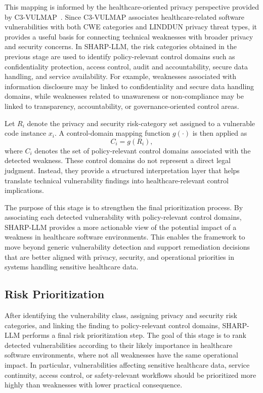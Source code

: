 \documentclass[conference]{IEEEtran}
\begin{document}
This mapping is informed by the healthcare-oriented privacy perspective provided by C3-VULMAP~\cite{ameh2025}. Since C3-VULMAP associates healthcare-related software vulnerabilities with both CWE categories and LINDDUN privacy threat types, it provides a useful basis for connecting technical weaknesses with broader privacy and security concerns. In SHARP-LLM, the risk categories obtained in the previous stage are used to identify policy-relevant control domains such as confidentiality protection, access control, audit and accountability, secure data handling, and service availability. For example, weaknesses associated with information disclosure may be linked to confidentiality and secure data handling domains, while weaknesses related to unawareness or non-compliance may be linked to transparency, accountability, or governance-oriented control areas.

Let $R_i$ denote the privacy and security risk-category set assigned to a vulnerable code instance $x_i$. A control-domain mapping function $g(\cdot)$ is then applied as
\begin{equation}
C_i = g(R_i),
\end{equation}
where $C_i$ denotes the set of policy-relevant control domains associated with the detected weakness. These control domains do not represent a direct legal judgment. Instead, they provide a structured interpretation layer that helps translate technical vulnerability findings into healthcare-relevant control implications.

The purpose of this stage is to strengthen the final prioritization process. By associating each detected vulnerability with policy-relevant control domains, SHARP-LLM provides a more actionable view of the potential impact of a weakness in healthcare software environments. This enables the framework to move beyond generic vulnerability detection and support remediation decisions that are better aligned with privacy, security, and operational priorities in systems handling sensitive healthcare data.

\subsection{Risk Prioritization}
After identifying the vulnerability class, assigning privacy and security risk categories, and linking the finding to policy-relevant control domains, SHARP-LLM performs a final risk prioritization step. The goal of this stage is to rank detected vulnerabilities according to their likely importance in healthcare software environments, where not all weaknesses have the same operational impact. In particular, vulnerabilities affecting sensitive healthcare data, service continuity, access control, or safety-relevant workflows should be prioritized more highly than weaknesses with lower practical consequence.
\end{document}
